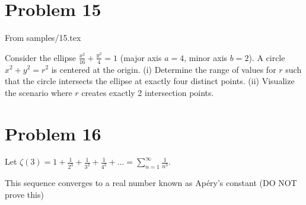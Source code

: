 \section*{Problem 15}
From samples/15.tex

Consider the ellipse $\frac{x^2}{16} + \frac{y^2}{4} = 1$ (major axis $a=4$, minor axis $b=2$).
A circle $x^2 + y^2 = r^2$ is centered at the origin.
(i) Determine the range of values for $r$ such that the circle intersects the ellipse at exactly four distinct points.
(ii) Visualize the scenario where $r$ creates exactly 2 intersection points.

\section*{Problem 16}

Let $\zeta(3) = 1 + \frac{1}{2^3} + \frac{1}{3^3} + \frac{1}{4^3} + \dots = \sum_{n=1}^\infty \frac{1}{n^3}$.

This sequence converges to a real number known as Apéry's constant (DO NOT prove this)

